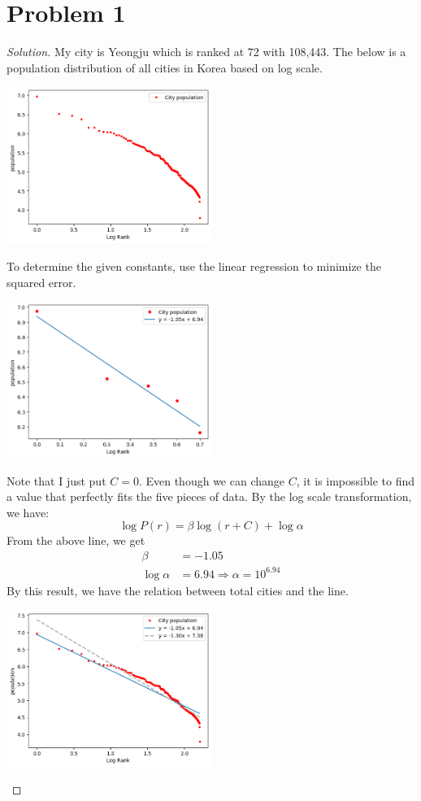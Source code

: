 \section*{Problem 1}
	\begin{proof} [Solution]
		My city is Yeongju which is ranked at 72 with 108,443. The below is a population distribution of all  cities in Korea based on log scale.
		\begin{center}
			\includegraphics[width=0.5\textwidth]{pops.png}
		\end{center}
		To determine the given constants, use the linear regression to minimize the squared error.
		\begin{center}
			\includegraphics[width=0.5\textwidth]{pops_reg.png}
		\end{center}
		Note that I just put $C = 0$. Even though we can change $C$, it is impossible to find a value that perfectly fits the five pieces of data. By the log scale transformation, we have:
		\begin{equation*}
			\log{P(r)} = \beta \log{(r + C)} + \log{\alpha}
		\end{equation*}
		From the above line, we get
		\begin{align*}
			\beta &= -1.05\\
			\log{\alpha} &= 6.94 \Rightarrow \alpha = 10^{6.94}
		\end{align*}
		By this result, we have the relation between total cities and the line.
		\begin{center}
			\includegraphics[width=0.5\textwidth]{pops_real.png}

\end{center}
\end{proof}

